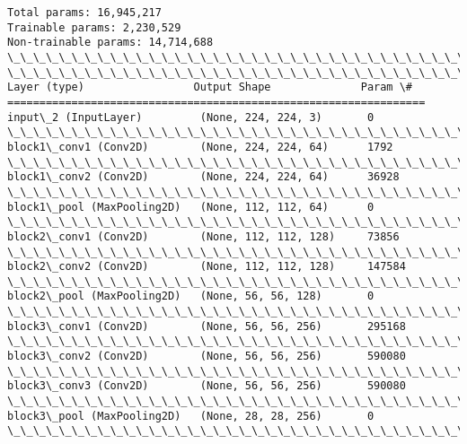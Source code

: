\documentclass[11pt]{article}
\begin{document}
\begin{Verbatim}[commandchars=\\\{\}]
Total params: 16,945,217
Trainable params: 2,230,529
Non-trainable params: 14,714,688
\_\_\_\_\_\_\_\_\_\_\_\_\_\_\_\_\_\_\_\_\_\_\_\_\_\_\_\_\_\_\_\_\_\_\_\_\_\_\_\_\_\_\_\_\_\_\_\_\_\_\_\_\_\_\_\_\_\_\_\_\_\_\_\_\_
\_\_\_\_\_\_\_\_\_\_\_\_\_\_\_\_\_\_\_\_\_\_\_\_\_\_\_\_\_\_\_\_\_\_\_\_\_\_\_\_\_\_\_\_\_\_\_\_\_\_\_\_\_\_\_\_\_\_\_\_\_\_\_\_\_
Layer (type)                 Output Shape              Param \#   
=================================================================
input\_2 (InputLayer)         (None, 224, 224, 3)       0         
\_\_\_\_\_\_\_\_\_\_\_\_\_\_\_\_\_\_\_\_\_\_\_\_\_\_\_\_\_\_\_\_\_\_\_\_\_\_\_\_\_\_\_\_\_\_\_\_\_\_\_\_\_\_\_\_\_\_\_\_\_\_\_\_\_
block1\_conv1 (Conv2D)        (None, 224, 224, 64)      1792      
\_\_\_\_\_\_\_\_\_\_\_\_\_\_\_\_\_\_\_\_\_\_\_\_\_\_\_\_\_\_\_\_\_\_\_\_\_\_\_\_\_\_\_\_\_\_\_\_\_\_\_\_\_\_\_\_\_\_\_\_\_\_\_\_\_
block1\_conv2 (Conv2D)        (None, 224, 224, 64)      36928     
\_\_\_\_\_\_\_\_\_\_\_\_\_\_\_\_\_\_\_\_\_\_\_\_\_\_\_\_\_\_\_\_\_\_\_\_\_\_\_\_\_\_\_\_\_\_\_\_\_\_\_\_\_\_\_\_\_\_\_\_\_\_\_\_\_
block1\_pool (MaxPooling2D)   (None, 112, 112, 64)      0         
\_\_\_\_\_\_\_\_\_\_\_\_\_\_\_\_\_\_\_\_\_\_\_\_\_\_\_\_\_\_\_\_\_\_\_\_\_\_\_\_\_\_\_\_\_\_\_\_\_\_\_\_\_\_\_\_\_\_\_\_\_\_\_\_\_
block2\_conv1 (Conv2D)        (None, 112, 112, 128)     73856     
\_\_\_\_\_\_\_\_\_\_\_\_\_\_\_\_\_\_\_\_\_\_\_\_\_\_\_\_\_\_\_\_\_\_\_\_\_\_\_\_\_\_\_\_\_\_\_\_\_\_\_\_\_\_\_\_\_\_\_\_\_\_\_\_\_
block2\_conv2 (Conv2D)        (None, 112, 112, 128)     147584    
\_\_\_\_\_\_\_\_\_\_\_\_\_\_\_\_\_\_\_\_\_\_\_\_\_\_\_\_\_\_\_\_\_\_\_\_\_\_\_\_\_\_\_\_\_\_\_\_\_\_\_\_\_\_\_\_\_\_\_\_\_\_\_\_\_
block2\_pool (MaxPooling2D)   (None, 56, 56, 128)       0         
\_\_\_\_\_\_\_\_\_\_\_\_\_\_\_\_\_\_\_\_\_\_\_\_\_\_\_\_\_\_\_\_\_\_\_\_\_\_\_\_\_\_\_\_\_\_\_\_\_\_\_\_\_\_\_\_\_\_\_\_\_\_\_\_\_
block3\_conv1 (Conv2D)        (None, 56, 56, 256)       295168    
\_\_\_\_\_\_\_\_\_\_\_\_\_\_\_\_\_\_\_\_\_\_\_\_\_\_\_\_\_\_\_\_\_\_\_\_\_\_\_\_\_\_\_\_\_\_\_\_\_\_\_\_\_\_\_\_\_\_\_\_\_\_\_\_\_
block3\_conv2 (Conv2D)        (None, 56, 56, 256)       590080    
\_\_\_\_\_\_\_\_\_\_\_\_\_\_\_\_\_\_\_\_\_\_\_\_\_\_\_\_\_\_\_\_\_\_\_\_\_\_\_\_\_\_\_\_\_\_\_\_\_\_\_\_\_\_\_\_\_\_\_\_\_\_\_\_\_
block3\_conv3 (Conv2D)        (None, 56, 56, 256)       590080    
\_\_\_\_\_\_\_\_\_\_\_\_\_\_\_\_\_\_\_\_\_\_\_\_\_\_\_\_\_\_\_\_\_\_\_\_\_\_\_\_\_\_\_\_\_\_\_\_\_\_\_\_\_\_\_\_\_\_\_\_\_\_\_\_\_
block3\_pool (MaxPooling2D)   (None, 28, 28, 256)       0         
\_\_\_\_\_\_\_\_\_\_\_\_\_\_\_\_\_\_\_\_\_\_\_\_\_\_\_\_\_\_\_\_\_\_\_\_\_\_\_\_\_\_\_\_\_\_\_\_\_\_\_\_\_\_\_\_\_\_\_\_\_\_\_\_\_

\end{Verbatim}
\end{document}
